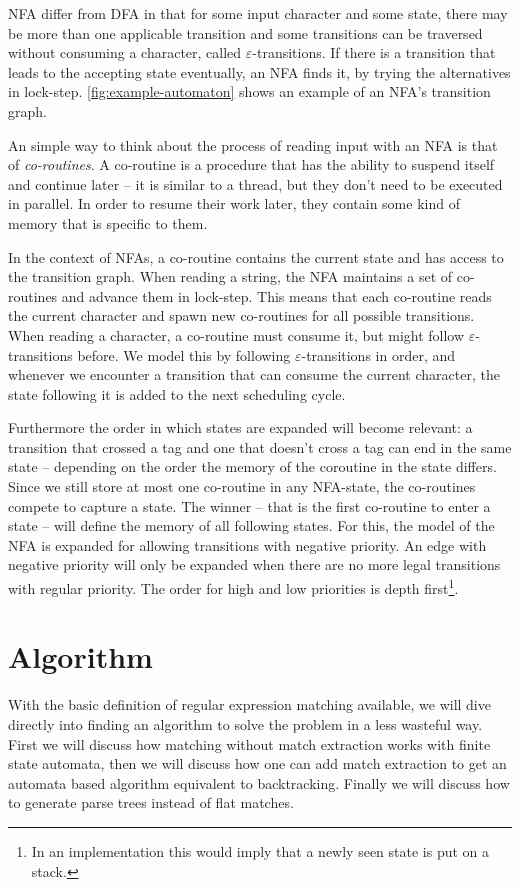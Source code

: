 \documentclass[11pt,a4paper,twoside,openright]{Thesis}
\theoremstyle{definition}
\newcommand{\seclabel}[1]{\label{sec:#1}}
\begin{document}
NFA differ from DFA in that for some input character and some state, there
may be more than one applicable transition and some transitions can be
traversed without consuming a character, called $\varepsilon$-transitions.  If
there is a transition that leads to the accepting state eventually, an NFA
finds it, by trying the alternatives in lock-step.
\autoref{fig:example-automaton} shows an example of an NFA's transition graph.

An simple way to think about the process of reading input with an NFA is that
of \emph{co-routines}. A co-routine is a procedure that has the ability to
suspend itself and continue later -- it is similar to a thread, but they
don't need to be executed in parallel. In order to resume their work later,
they contain some kind of memory that is specific to them.

In the context of NFAs, a co-routine contains the current state and has access
to the transition graph. When reading a
string, the NFA maintains a set of co-routines and advance them in
lock-step. This means that each co-routine reads the current character and
spawn new co-routines for all possible transitions. When reading a character,
a co-routine must consume it, but might follow $\varepsilon$-transitions
before. We model this by following $\varepsilon$-transitions in order, and 
whenever we encounter a transition that can consume the current character, 
the state following it is added to the next scheduling cycle.

Furthermore the order in which states are expanded will become relevant: a
transition that crossed a tag and one that doesn't cross a tag can end in the
same state -- depending on the order the memory of the coroutine in the state
differs. Since we still store at most one co-routine in any NFA-state, the
co-routines compete to capture a state. The winner -- that is the first
co-routine to enter a state -- will define the memory of all following states.
For this, the model of the NFA is expanded for allowing transitions with
negative priority. An edge with negative priority will only be expanded when
there are no more legal transitions with regular priority. The order for high
and low priorities is depth first\footnote{In an implementation this would
  imply that a newly seen state is put on a stack.}.

\chapter{Algorithm} \seclabel{algo}
With the basic definition of regular expression matching available, we will 
dive directly into finding an algorithm to solve the problem in a less 
wasteful way. First we will discuss how matching without match extraction 
works with finite state automata, then we will discuss how one can add 
match extraction to get an automata based algorithm equivalent to backtracking.
Finally we will discuss how to generate parse trees instead of flat matches.
\end{document}
